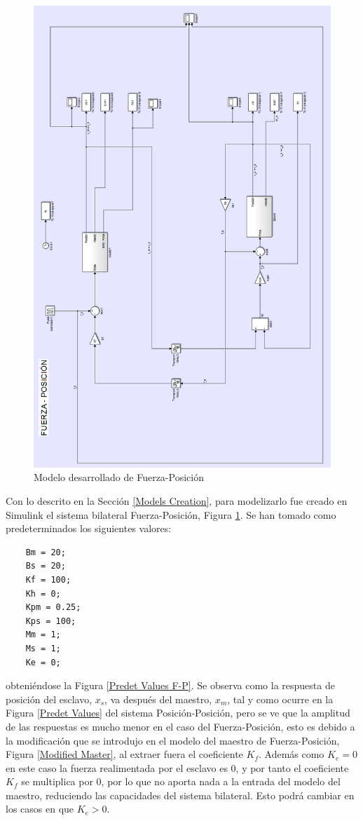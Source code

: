 \documentclass[a4paper, fontsize=11pt]{scrartcl} %
\numberwithin{equation}{section} %
\numberwithin{figure}{section} %
\numberwithin{table}{section} %
\begin{document}
	\begin{figure}[h!]
		\centering
		\includegraphics[height=1.42\linewidth]{images/Model_FOR-POS.PNG}
		\caption{Modelo desarrollado de Fuerza-Posición}
		\label{Model Force-Position}
	\end{figure}
	
	
	Con lo descrito en la Sección \ref{Models Creation}, para modelizarlo fue creado en Simulink el sistema bilateral Fuerza-Posición, Figura \ref{Model Force-Position}. Se han tomado como predeterminados los siguientes valores:
	
	\begin{lstlisting}
	Bm = 20;
	Bs = 20;
	Kf = 100;
	Kh = 0;
	Kpm = 0.25;
	Kps = 100;
	Mm = 1;
	Ms = 1;
	Ke = 0;
	\end{lstlisting}
	\label{Predet2}
	obteniéndose la Figura \ref{Predet Values F-P}. Se observa como la respuesta de posición del esclavo, $x_s$, va después del maestro, $x_m$, tal y como ocurre en la Figura \ref{Predet Values} del sistema Posición-Posición, pero se ve que la amplitud de las respuestas es mucho menor en el caso del Fuerza-Posición, esto es debido a la modificación que se introdujo en el modelo del maestro de Fuerza-Posición, Figura \ref{Modified Master}, al extraer fuera el coeficiente $K_f$. Además como $K_e = 0$ en este caso la fuerza realimentada por el esclavo es $0$, y por tanto el coeficiente $K_f$ se multiplica por $0$, por lo que no aporta nada a la entrada del modelo del maestro, reduciendo las capacidades del sistema bilateral. Esto podrá cambiar en los casos en que $K_e > 0$.
	 
\end{document}
